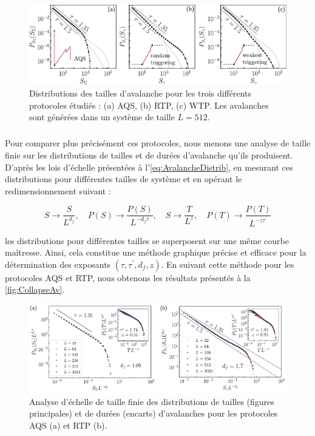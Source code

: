 \begin{figure}[h]
	\centering
	\includegraphics[width=\textwidth]{Chapitre4/Figures/Avalanches/Comparaison_Distrib.pdf}
	\caption{Distributions des tailles d'avalanche pour les trois différents protocoles étudiés : (a) AQS, (b) RTP, (c) WTP. Les avalanches sont générées dans un système de taille $L=512$.}
	\label{fig:DistribProtocols}
\end{figure}

\subparagraph{}Pour comparer plus précisément ces protocoles, nous menons une analyse de taille finie sur les distributions de tailles et de durées d'avalanche qu'ils produisent. D'après les lois d'échelle présentées à l'\autoref{eq:AvalancheDistrib}, en mesurant ces distributions pour différentes tailles de système et en opérant le redimensionnement suivant :

\begin{equation}
	S \rightarrow \frac{S}{L^{d_f}}, \quad P(S) \rightarrow \frac{P(S)}{L^{-d_f\tau}},\quad S \rightarrow \frac{T}{L^{z}}, \quad P(T) \rightarrow \frac{P(T)}{L^{-z\tau^\prime}}
\end{equation}

\noindent les distributions pour différentes tailles se superposent sur une même courbe maîtresse. Ainsi, cela constitue une méthode graphique précise et efficace pour la détermination des exposants $(\tau, \tau^\prime, d_f, z)$. En suivant cette méthode pour les protocoles AQS et RTP, nous obtenons les résultats présentés à la \autoref{fig:CollapseAv}.

\begin{figure}[h]
	\centering
	\includegraphics[width=\textwidth]{Chapitre4/Figures/Avalanches/Collapse.pdf}
	\caption{Analyse d'échelle de taille finie des distributions de tailles (figures principales) et de durées (encarts) d'avalanches pour les protocoles AQS (a) et RTP (b).}
	\label{fig:CollapseAv}
\end{figure}


